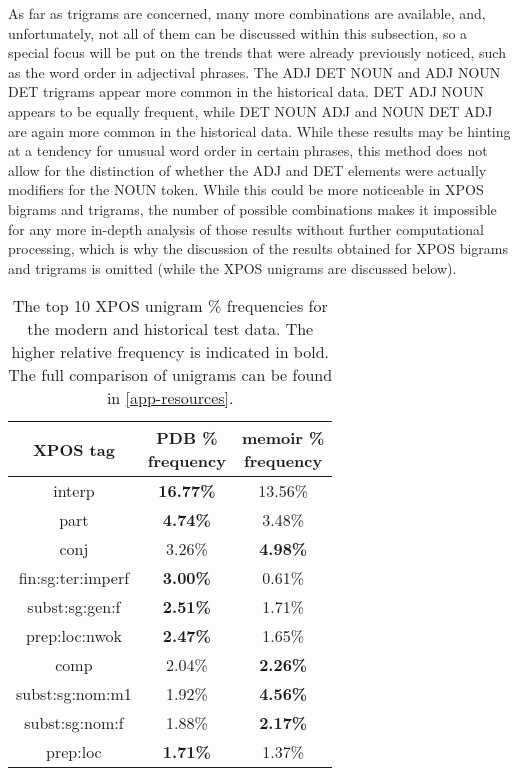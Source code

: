 As far as trigrams are concerned, many more combinations are available, and, unfortunately, not all of them can be discussed within this subsection, so a special focus will be put on the trends that were already previously noticed, such as the word order in adjectival phrases. The ADJ DET NOUN and ADJ NOUN DET trigrams appear more common in the historical data. DET ADJ NOUN appears to be equally frequent, while DET NOUN ADJ and NOUN DET ADJ are again more common in the historical data. While these results may be hinting at a tendency for unusual word order in certain phrases, this method does not allow for the distinction of whether the ADJ and DET elements were actually modifiers for the NOUN token. While this could be more noticeable in XPOS bigrams and trigrams, the number of possible combinations makes it impossible for any more in-depth analysis of those results without further computational processing, which is why the discussion of the results obtained for XPOS bigrams and trigrams is omitted (while the XPOS unigrams are discussed below).

\renewcommand{\arraystretch}{1.25}
\begin{table}[H]
\begin{center}
\begin{tabular}{|c|cc|}
\hline \bf XPOS tag & \bf \makecell[c]{PDB \% \\ frequency} & \bf \makecell[c]{memoir \% \\ frequency} \\ \hline
interp & \textbf{16.77\%} & 13.56\% \\
part &\textbf{ 4.74\%} & 3.48\% \\
conj & 3.26\% & \textbf{4.98\%} \\
fin:sg:ter:imperf & \textbf{3.00\%} & 0.61\% \\
subst:sg:gen:f & \textbf{2.51\%} & 1.71\% \\
prep:loc:nwok & \textbf{2.47\%} & 1.65\% \\
comp & 2.04\% & \textbf{2.26\%} \\
subst:sg:nom:m1 & 1.92\% & \textbf{4.56\%} \\
subst:sg:nom:f & 1.88\% &\textbf{ 2.17\%} \\
prep:loc & \textbf{1.71\%} & 1.37\% \\
\hline
\end{tabular}
\caption{\label{table:xpos-unigrams} The top 10 XPOS unigram \% frequencies for the modern and historical test data. The higher relative frequency is indicated in bold. The full comparison of unigrams can be found in \autoref{app-resources}.}
\end{center}
\end{table}

